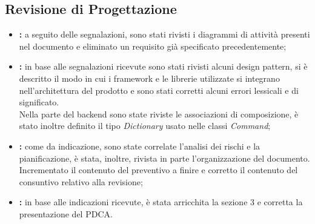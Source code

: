 	\subsection{Revisione di Progettazione}
	\begin{itemize}
		\item \textbf{\docNameAdR:} a seguito delle segnalazioni, sono stati rivisti i diagrammi di attività presenti nel documento e eliminato un requisito già specificato precedentemente;
		\item \textbf{\docNameST:} in base alle segnalazioni ricevute sono stati rivisti alcuni design pattern, si è descritto il modo in cui i framework e le librerie utilizzate si integrano nell'architettura del prodotto e sono stati corretti alcuni errori lessicali e di significato.\\
		Nella parte del backend sono state riviste le associazioni di composizione, è stato inoltre definito il tipo \textit{Dictionary} usato nelle classi \textit{Command};
		\item \textbf{\docNamePdP:} come da indicazione, sono state correlate l'analisi dei rischi e la pianificazione, è stata, inoltre, rivista in parte l'organizzazione del documento. Incrementato il contenuto del preventivo a finire e corretto il contenuto del consuntivo relativo alla revisione;
		\item \textbf{\docNamePdQ:} in base alle indicazioni ricevute, è stata arricchita la sezione 3 e corretta la presentazione del PDCA. 
	\end{itemize}
	
